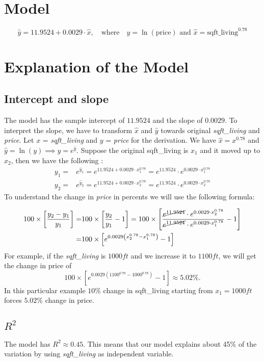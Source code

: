 \documentclass[10pt]{article}
\begin{document}
	\nopagebreak
\section*{Model}
	\[\hat{y}=11.9524+0.0029\cdot \hat{x},\quad \text{where}\quad  \hat{y}=\ln (\text{price})\text{ and } \hat{x} = \text{sqft\_living}^{0.78}  \]
\section*{Explanation of the Model}
\subsection*{Intercept and slope}
The model has the sample intercept of \(11.9524\) and the slope of \(0.0029\).  To interpret the slope, we have to transform \(\hat{x}\) and \(\hat{y}\) towards original {\it sqft\_living} and {\it price}. Let \(x\) = {\it sqft\_living}  and \(y\) = {\it price} for the derivation. We have  \(\hat{x} = x^{0.78}\) and \(\hat{y} = \ln (y)\implies y  = e^{\hat{y}}\). Suppose the original sqft\_living is \(x_1\) and it moved up to \(x_2\), then we have the following :
\begin{align*}
	y_1 =& e^{\hat{y}_1 }= e^{11.9524+0.0029\cdot x_1^{0.78}}  = e^{11.9524}\cdot e^{0.0029\cdot x_1^{0.78}}\\
	y_2 =& e^{\hat{y}_2 }= e^{11.9524+0.0029\cdot x_2^{0.78}}  = e^{11.9524}\cdot e^{0.0029\cdot x_2^{0.78}}
\end{align*}
To understand the change in {\it price} in percents we will use the following formula:

\begin{align*}
100 \times \left[\frac{y_2-y_1}{y_1} \right] =& 100 \times \left[\frac{y_2}{y_1} - 1\right] = 100\times \left[\frac{ \cancel{e^{11.9524}}\cdot e^{0.0029\cdot x_2^{0.78}}}{\cancel{e^{11.9524}}\cdot e^{0.0029\cdot x_1^{0.78}}} -1 \right] \\
=& 100 \times \left[ e^{0.0029\left( x_2^{0.78} - x_1^{0.78} \right)} -1 \right]
\end{align*}
For example, if the {\it sqft\_living} is \(1000ft\) and we increase it to \(1100ft\), we will get the change in price of
 \[100\times \left[e^{0.0029(1100^{0.78}-1000^{0.78})}-1\right] \approx 5.02\%. \]
In this particular example \(10\%\) change in sqft\_living starting from \(x_1 = 1000ft\) forces \(5.02\%\) change in price.
\subsection*{\textbf{\(R^2 \)}}
The model has \(R^2\approx 0.45\).  This means that our model explains about 45\% of the variation by using {\it sqft\_living} as independent variable.
\end{document}
